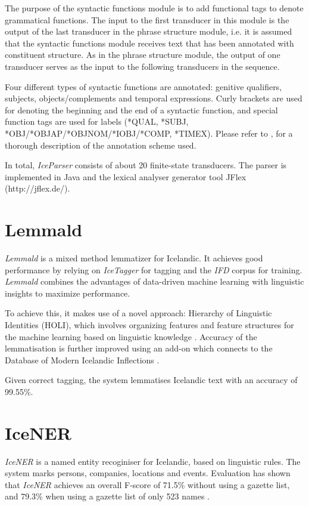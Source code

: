 \documentclass[11pt]{article}
\begin{document}
The purpose of the syntactic functions module is to add functional tags to denote grammatical functions.
The input to the first transducer in this module is the output of the last transducer in the phrase structure module, i.e. it is assumed that the syntactic functions module receives text that has been annotated with constituent structure.
As in the phrase structure module, the output of one transducer serves as the input to the following transducers in the sequence.

Four different types of syntactic functions are annotated: genitive qualifiers, subjects, objects/complements and temporal expressions.
Curly brackets are used for denoting the beginning and the end of a syntactic function, and special function tags are used for labels (*QUAL, *SUBJ, *OBJ/*OBJAP/*OBJNOM/*IOBJ/*COMP, *TIMEX).
Please refer to \citep{lof06c}, for a thorough description of the annotation scheme used.

In total, \emph{IceParser} consists of about 20 finite-state transducers.
The parser is implemented in Java and the lexical analyser generator tool JFlex (http://jflex.de/).

\section{Lemmald}
\emph{Lemmald} is a mixed method lemmatizer for Icelandic.
It achieves good performance by relying on \emph{IceTagger} for tagging and the \emph{IFD} corpus for training.
\emph{Lemmald} combines the advantages of data-driven machine learning with linguistic insights to maximize performance.

To achieve this, it makes use of a novel approach: Hierarchy of Linguistic Identities (HOLI), which involves organizing features and feature structures for the machine learning based on linguistic knowledge \citep{ant08}.
Accuracy of the lemmatisation is further improved using an add-on which connects to the Database of Modern Icelandic Inflections \citep{kri05}.

Given correct tagging, the system lemmatises Icelandic text with an accuracy of 99.55\%.

\section{IceNER}
\emph{IceNER} is a named entity recoginiser for Icelandic, based on linguistic rules.
The system marks persons, companies, locations and events.
Evaluation has shown that \emph{IceNER} achieves an overall F-score of 71.5\% without using a gazette list, and 79.3\% when using a gazette list of only 523 names \citep{try09}.
\end{document}
